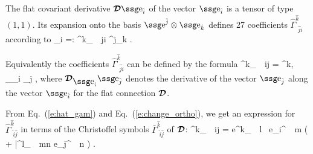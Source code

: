 The flat covariant derivative  $\wg{\cD}\w{e}_{\hat i}$ of the vector 
$\w{e}_{\hat i}$ is a tensor of type $(1,1)$. Its expansion onto the
basis $\w{e}^{\hat j}\otimes \w{e}_{\hat k}$ defines
27 coefficients $\hat \Gamma^{\hat k}_{\ \, \hat j\hat i}$
according to 
\be
	\wg{\cD}_{\hat i} =: \hat \Gamma^{\hat k}_{\ \, \hat j\hat i}
		\: ^{\hat j}\otimes {}_{\hat k} . 
\ee


Equivalently the coefficients $\hat \Gamma^{\hat k}_{\ \, \hat j\hat i}$
can be defined by the formula
\be \label{e:hat_gam}
	\hat \Gamma^{\hat k}_{\ \, \hat i\hat j} = 
	\langle {}^{\hat k}, \wg{\cD}_{_{\hat i}} _{\hat j}
	\rangle , 
\ee
where $\wg{\cD}_{\w{e}_{\hat i}} \w{e}_{\hat j}$ denotes the derivative
of the vector $\w{e}_{\hat j}$ along the vector $\w{e}_{\hat i}$ for
the flat connection $\mbox{\boldmath ${{\cal D}}$}$. 


From Eq.~(\ref{e:hat_gam}) and Eq.~(\ref{e:change_ortho}),
we get an expression for $\hat \Gamma^{\hat k}_{\ \, \hat i\hat j}$
in terms of the Christoffel symbols 
$\bar \Gamma^{\hat k}_{\ \, \hat i\hat j}$
of $\mbox{\boldmath ${{\cal D}}$}$:
\be \label{e:hat_Gam_Christo}
	\hat \Gamma^{\hat k}_{\ \, \hat i\hat j} = e^{\hat k}_{\ \, l}
	\, e_{\hat i}^{\ \, m} \left( 
	+ \bar\Gamma^l_{\ \, mn} e_{\hat j}^{\ \, n} \right) . 
\ee



